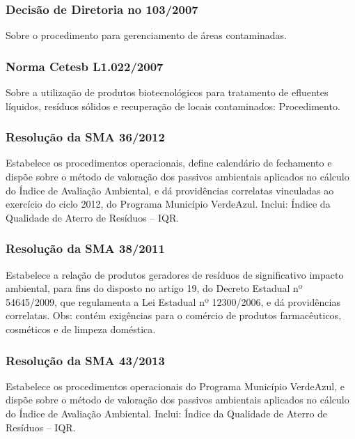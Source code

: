 \begin{subapend}
\begin{subsubapend}
		\subsubsection{Decisão de Diretoria no 103/2007}
		Sobre o procedimento para gerenciamento de áreas contaminadas.
		\subsubsection{Norma Cetesb L1.022/2007}
		Sobre a utilização de produtos biotecnológicos para tratamento de efluentes líquidos, resíduos sólidos e recuperação de locais contaminados: Procedimento.
		\subsubsection{Resolução da SMA 36/2012}
		Estabelece os procedimentos operacionais, define calendário de fechamento e dispõe sobre o método de valoração dos passivos ambientais aplicados no cálculo do Índice de Avaliação Ambiental, e dá providências correlatas vinculadas ao exercício do ciclo 2012, do Programa Município VerdeAzul. Inclui: Índice da Qualidade de Aterro de Resíduos – IQR.
		\subsubsection{Resolução da SMA 38/2011}
		Estabelece a relação de produtos geradores de resíduos de significativo impacto ambiental, para fins do disposto no artigo 19, do Decreto Estadual nº 54645/2009, que regulamenta a Lei Estadual nº 12300/2006, e dá providências correlatas. Obs: contém exigências para o comércio de produtos farmacêuticos, cosméticos e de limpeza doméstica.
		\subsubsection{Resolução da SMA 43/2013}
		Estabelece os procedimentos operacionais do Programa Município VerdeAzul, e dispõe sobre o método de valoração dos passivos ambientais aplicados no cálculo do Índice de Avaliação Ambiental. Inclui: Índice da Qualidade de Aterro de Resíduos – IQR.
	\end{subsubapend}
\end{subapend}

